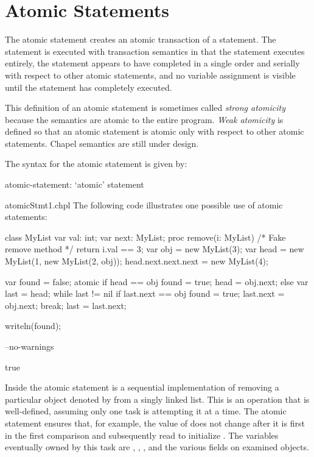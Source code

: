 \section{Atomic Statements}
\label{Atomic_Transactions}
\label{atomicity}

The atomic statement creates an atomic transaction of a statement. The
statement is executed with transaction semantics in that the statement
executes entirely, the statement appears to have completed in a single
order and serially with respect to other atomic statements, and no
variable assignment is visible until the statement has completely
executed.

\begin{openissue}
This definition of an atomic statement is sometimes called {\em strong
atomicity} because the semantics are atomic to the entire program.
{\em Weak atomicity} is defined so that an atomic statement is atomic
only with respect to other atomic statements.  Chapel semantics are
still under design.
\end{openissue}

The syntax for the atomic statement is given by:
\begin{syntax}
atomic-statement:
  `atomic' statement
\end{syntax}

\begin{chapelexample}{atomicStmt1.chpl}
The following code illustrates one possible use of atomic statements:
\begin{chapelpre}
class MyList {
  var val: int;
  var next: MyList;
  proc remove(i: MyList) {
    /* Fake remove method */
    return i.val == 3;
  }
}
var obj = new MyList(3);
var head = new MyList(1, new MyList(2, obj));
head.next.next.next = new MyList(4);
\end{chapelpre}
\begin{chapel}
var found = false;
atomic {
  if head == obj {
    found = true;
    head = obj.next;
  } else {
    var last = head;
    while last != nil {
      if last.next == obj {
        found = true;
        last.next = obj.next;
        break;
      }
      last = last.next;
    }
  }
}
\end{chapel}
\begin{chapelpost}
writeln(found);
\end{chapelpost}
\begin{chapelcompopts}
--no-warnings
\end{chapelcompopts}
\begin{chapeloutput}
true
\end{chapeloutput}
Inside the atomic statement is a sequential implementation of removing
a particular object denoted by  from a singly linked list.
This is an operation that is well-defined, assuming only one task is
attempting it at a time. The atomic statement ensures that, for
example, the value of  does not change after it is first in
the first comparison and subsequently read to
initialize . The variables eventually owned by this task
are , , , and the various 
fields on examined objects.
\end{chapelexample}

